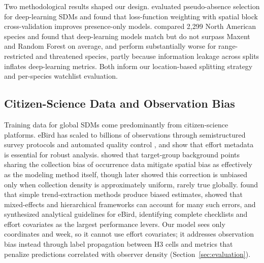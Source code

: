 Two methodological results shaped our design. \citet{zbinden2024selection} evaluated pseudo-absence selection for deep-learning SDMs and found that loss-function weighting with spatial block cross-validation improves presence-only models. \citet{kellenberger2026performance} compared 2,299 North American species and found that deep-learning models match but do not surpass Maxent and Random Forest on average, and perform substantially worse for range-restricted and threatened species, partly because information leakage across splits inflates deep-learning metrics. Both inform our location-based splitting strategy and per-species watchlist evaluation.

\subsection{Citizen-Science Data and Observation Bias}
\label{sec:related-bias}

Training data for global SDMs come predominantly from citizen-science platforms. eBird \citep{sullivan2009ebird} has scaled to billions of observations through semistructured survey protocols and automated quality control \citep{sullivan2014ebird}, and \citet{kelling2019semistructured} show that effort metadata is essential for robust analysis. \citet{phillips2009sample} showed that target-group background points sharing the collection bias of occurrence data mitigate spatial bias as effectively as the modeling method itself, though \citet{botella2020bias} later showed this correction is unbiased only when collection density is approximately uniform, rarely true globally. \citet{isaac2014statistics} found that simple trend-extraction methods produce biased estimates, \citet{bird2014statistical} showed that mixed-effects and hierarchical frameworks can account for many such errors, and \citet{johnston2021analytical} synthesized analytical guidelines for eBird, identifying complete checklists and effort covariates as the largest performance levers. Our model sees only coordinates and week, so it cannot use effort covariates; it addresses observation bias instead through label propagation between H3 cells and metrics that penalize predictions correlated with observer density (Section~\ref{sec:evaluation}).

